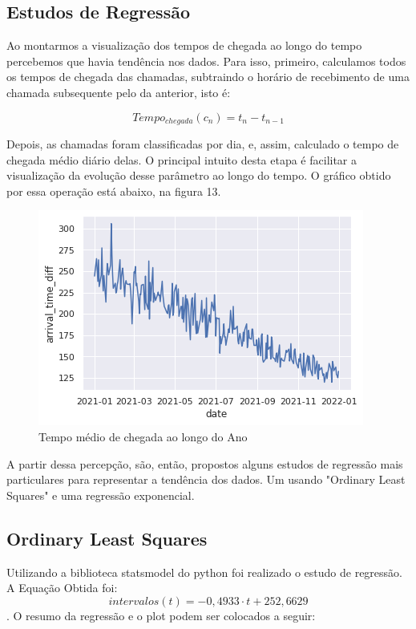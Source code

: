 \subsection{Estudos de Regressão}

Ao montarmos a visualização dos tempos de chegada ao longo do tempo percebemos que havia tendência nos dados. Para isso, primeiro, calculamos todos os tempos de chegada das chamadas, subtraindo o horário de recebimento de uma chamada subsequente pelo da anterior, isto é:

$$Tempo_{chegada}(c_n) = t_n - t_{n-1}$$ 


Depois, as chamadas foram classificadas por dia, e, assim, calculado o tempo de chegada médio diário delas. O principal intuito desta etapa é facilitar a visualização da evolução desse parâmetro ao longo do tempo. O gráfico obtido por essa operação está abaixo, na figura 13.

\begin{figure}[H]
    \includegraphics{analise-de-dados/regressao/tempo_chegada_medio.png}
    \caption{Tempo médio de chegada ao longo do Ano}
    \label{fig: tempos_de_chegada}
\end{figure}

A partir dessa percepção, são, então, propostos alguns estudos de regressão mais particulares para representar a tendência dos dados. Um usando "Ordinary Least Squares" e uma regressão exponencial.  

\subsection{Ordinary Least Squares}

Utilizando a biblioteca statsmodel do python foi realizado o estudo de regressão. A Equação Obtida foi: $$intervalos(t) = -0,4933 \cdot t + 252,6629$$. O resumo da regressão e o plot podem ser colocados a seguir: 

